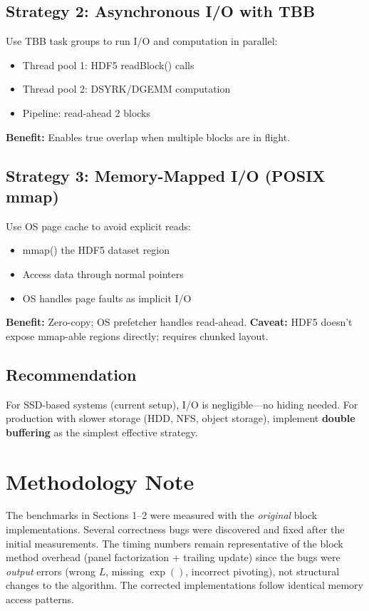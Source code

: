 \documentclass[11pt,a4paper]{article}
\begin{document}
\subsection{Strategy 2: Asynchronous I/O with TBB}
Use TBB task groups to run I/O and computation in parallel:
\begin{itemize}
\item Thread pool 1: HDF5 readBlock() calls
\item Thread pool 2: DSYRK/DGEMM computation
\item Pipeline: read-ahead 2 blocks
\end{itemize}
\textbf{Benefit:} Enables true overlap when multiple blocks are in flight.

\subsection{Strategy 3: Memory-Mapped I/O (POSIX mmap)}
Use OS page cache to avoid explicit reads:
\begin{itemize}
\item mmap() the HDF5 dataset region
\item Access data through normal pointers
\item OS handles page faults as implicit I/O
\end{itemize}
\textbf{Benefit:} Zero-copy; OS prefetcher handles read-ahead.
\textbf{Caveat:} HDF5 doesn't expose mmap-able regions directly; requires chunked layout.

\subsection{Recommendation}
For SSD-based systems (current setup), I/O is negligible---no hiding needed. For production with slower storage (HDD, NFS, object storage), implement \textbf{double buffering} as the simplest effective strategy.

\section{Methodology Note}

The benchmarks in Sections 1--2 were measured with the \emph{original} block
implementations. Several correctness bugs were discovered and fixed after the
initial measurements. The timing numbers remain representative of the block
method overhead (panel factorization + trailing update) since the bugs were
\emph{output} errors (wrong $L$, missing $\exp()$, incorrect pivoting), not
structural changes to the algorithm. The corrected implementations follow
identical memory access patterns.
\end{document}
